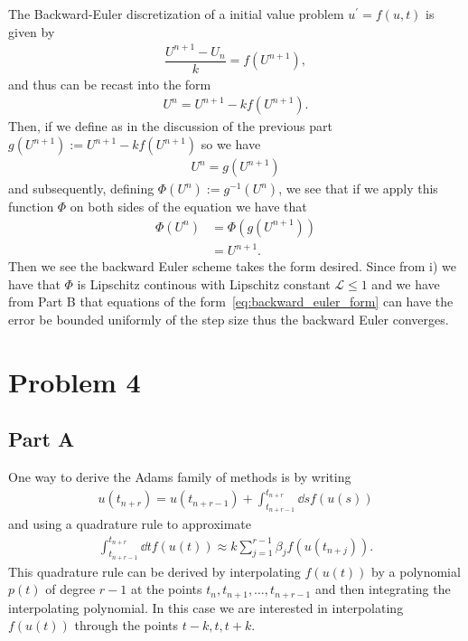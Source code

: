\documentclass[12pt]{article}
\begin{document}
The Backward-Euler discretization of a initial value problem $u^{\prime} = f(u, t)$ is given by
\begin{align}
    \dfrac{U^{n+1}-U_{n}}{k} = f(U^{n+1}),
\end{align}
and thus can be recast into the form 
\begin{align}
    U^{n} = U^{n+1} - kf(U^{n+1}).
\end{align}
Then, if we define as in the discussion of the previous part $g(U^{n+1}) := U^{n+1} - kf(U^{n+1})$ so we have
\begin{align}
    U^{n} = g(U^{n+1})
\end{align}
and subsequently, defining $\Phi(U^{n}) := g^{-1}(U^{n})$, we see that if we apply this function $\Phi$ on both sides of the equation we have that
\begin{subequations}
    \begin{align}
        \Phi(U^{n}) &= \Phi(g(U^{n+1})) \\
        &= U^{n+1}.
    \end{align}
    \label{eq:backward_euler_form}
\end{subequations}
Then we see the backward Euler scheme takes the form desired. Since from i) we have that $\Phi$ is Lipschitz continous with Lipschitz constant $\mathcal{L} \le 1$ and we have from Part B that equations of the form~\eqref{eq:backward_euler_form} can have the error be bounded uniformly of the step size thus the backward Euler converges. 


\section*{Problem 4}

\subsection*{Part A}

One way to derive the Adams family of methods is by writing 
\begin{align}
	u(t_{n+r}) = u(t_{n+r-1}) + \int_{t_{n+r-1}}^{t_{n+r}}\dd{s} f(u(s))
\end{align}
and using a quadrature rule to approximate
\begin{align}
	\int_{t_{n+r-1}}^{t_{n+r}}\dd{t}f(u(t)) \approx k\sum_{j=1}^{r-1}\beta_{j}f(u(t_{n+j})).
\end{align}
This quadrature rule can be derived by interpolating $f(u(t))$ by a polynomial $p(t)$ of degree $r-1$ at the points $t_{n},t_{n+1},\dots,t_{n+r-1}$ and then integrating the interpolating polynomial. In this case we are interested in interpolating $f(u(t))$ through the points $t-k,t,t+k$. 
\end{document}

